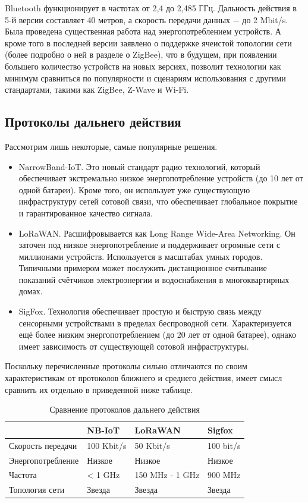     Bluetooth функционирует в частотах от 2,4 до 2,485 ГГц. Дальность действия в 5-й версии составляет 40 метров,
    а скорость передачи данных $-$ до 2 Mbit/s. Была проведена существенная работа над энергопотреблением 
    устройств. А кроме того в последней версии заявлено о поддержке ячеистой топологии сети (более подробно
    о ней в разделе о ZigBee), что в будущем, при появлении большего количество устройств на новых версиях,
    позволит технологии как минимум сравниться по популярности и сценариям использования с другими
    стандартами, такими как ZigBee, Z-Wave и Wi-Fi.
    
    
    \subsection{Протоколы дальнего действия}
    
   	Рассмотрим лишь некоторые, самые популярные решения.
   	
   	\begin{itemize}
   		\item NarrowBand-IoT. Это новый стандарт радио технологий, который обеспечивает экстремально
   		низкое энергопотребление устройств (до 10 лет от одной батареи). Кроме того, он использует уже
   		существующую инфраструктуру сетей сотовой связи, что обеспечивает глобальное покрытие и
   		гарантированное качество сигнала.
   		\item LoRaWAN. Расшифровывается как Long Range Wide-Area Networking. Он заточен под
   		низкое энергопотребление и поддерживает огромные сети с миллионами устройств. Используется
   		в масштабах умных городов. Типичными примером может послужить дистанционное считывание 
   		показаний счётчиков электроэнергии и водоснабжения в многоквартирных домах.
   		\item SigFox. Технология обеспечивает простую и быструю связь между сенсорными устройствами 
   		в пределах беспроводной сети. Характеризуется ещё более низким энергопотреблением (до 20 лет
   		от одной батарее), однако имеет зависимость от существующей сотовой инфраструктуры.
   	\end{itemize}
   
   Поскольку перечисленные протоколы сильно отличаются по своим характеристикам от протоколов 
   ближнего и среднего действия, имеет смысл сравнить их отдельно в приведенной ниже таблице.
   
   \begin{table}[h]
   	\centering
   	\begin{tabular}{ | l | l | l | l |}
   		\hline
   		& NB-IoT & LoRaWAN & Sigfox \\ \hline
   		Скорость передачи & 100 Kbit/s & 50 Kbit/s & 100 bit/s \\ \hline
   		Энергопотребление & Низкое & Низкое & Низкое \\ \hline
   		Частота & < 1 GHz  & 150 MHz - 1 GHz & 900 MHz \\ \hline
   		Топология сети & Звезда & Звезда & Звезда \\
   		\hline
   	\end{tabular}
   	\caption{Сравнение протоколов дальнего действия}
   	\label{table-long-range-solutions}
   \end{table}
	

